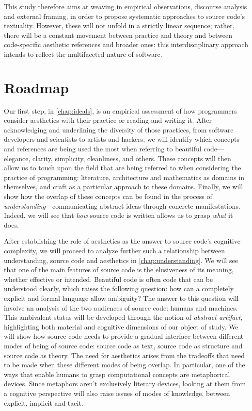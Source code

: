 This study therefore aims at weaving in empirical observations, discourse analysis and external framing, in order to propose systematic approaches to source code's textuality. However, these will not unfold in a strictly linear sequence; rather, there will be a constant movement between practice and theory and between code-specific aesthetic references and broader ones: this interdisciplinary approach intends to reflect the multifaceted nature of software.

\section{Roadmap}
\label{sec:roadmap}

Our first step, in \autoref{chap:ideals}, is an empirical assessment of how programmers consider aesthetics with their practice or reading and writing it. After acknowledging and underlining the diversity of those practices, from software developers and scientists to artists and hackers, we will identify which concepts and references are being used the most when referring to beautiful code—elegance, clarity, simplicity, cleanliness, and others. These concepts will then allow us to touch upon the field that are being referred to when considering the practice of programming: literature, architecture and mathematics as domains in themselves, and craft as a particular approach to these domains. Finally, we will show how the overlap of these concepts can be found in the process of \emph{understanding}—communicating abstract ideas through concrete manifestations. Indeed, we will see that \emph{how} source code is written allows us to grasp \emph{what} it does.

After establishing the role of aesthetics as the answer to source code's cognitive complexity, we will proceed to analyze further such a relationship between understanding, source code and aesthetics in \autoref{chap:understanding}. We will see that one of the main features of source code is the elusiveness of its meaning, whether effective or intended. Beautiful code is often code that can be understood clearly, which raises the following question: how can a completely explicit and formal language allow ambiguity? The answer to this question will involve an analysis of the two audiences of source code: humans and machines. This ambivalent status will be developed through the notion of \emph{abstract artifact}, highlighting both material and cognitive dimensions of our object of study. We will show how source code needs to provide a gradual interface between different modes of being of source code: source code as text, source code as structure and source code as theory. The need for aesthetics arises from the tradeoffs that need to be made when these different modes of being overlap. In particular, one of the ways that enable humans to grasp computational concepts are metaphorical devices. Since metaphors aren't exclusively literary devices, looking at them from a cognitive perspective will also raise issues of modes of knowledge, between explicit, implicit and tacit.

